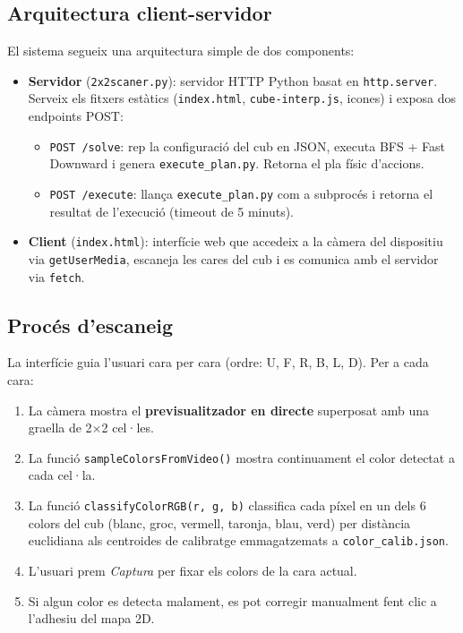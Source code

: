 \documentclass[12pt, a4paper]{article}
\begin{document}
\subsection{Arquitectura client-servidor}

El sistema segueix una arquitectura simple de dos components:

\begin{itemize}
  \item \textbf{Servidor} (\texttt{2x2scaner.py}): servidor HTTP Python basat en \texttt{http.server}. Serveix els fitxers estàtics (\texttt{index.html}, \texttt{cube-interp.js}, icones) i exposa dos endpoints POST:
  \begin{itemize}
    \item \texttt{POST /solve}: rep la configuració del cub en JSON, executa BFS + Fast Downward i genera \texttt{execute\_plan.py}. Retorna el pla físic d'accions.
    \item \texttt{POST /execute}: llança \texttt{execute\_plan.py} com a subprocés i retorna el resultat de l'execució (timeout de 5 minuts).
  \end{itemize}
  \item \textbf{Client} (\texttt{index.html}): interfície web que accedeix a la càmera del dispositiu via \texttt{getUserMedia}, escaneja les cares del cub i es comunica amb el servidor via \texttt{fetch}.
\end{itemize}

\subsection{Procés d'escaneig}

La interfície guia l'usuari cara per cara (ordre: U, F, R, B, L, D). Per a cada cara:

\begin{enumerate}
  \item La càmera mostra el \textbf{previsualitzador en directe} superposat amb una graella de 2×2 cel·les.
  \item La funció \texttt{sampleColorsFromVideo()} mostra continuament el color detectat a cada cel·la.
  \item La funció \texttt{classifyColorRGB(r, g, b)} classifica cada píxel en un dels 6 colors del cub (blanc, groc, vermell, taronja, blau, verd) per distància euclidiana als centroides de calibratge emmagatzemats a \texttt{color\_calib.json}.
  \item L'usuari prem \textit{Captura} per fixar els colors de la cara actual.
  \item Si algun color es detecta malament, es pot corregir manualment fent clic a l'adhesiu del mapa 2D.
\end{enumerate}
\end{document}

